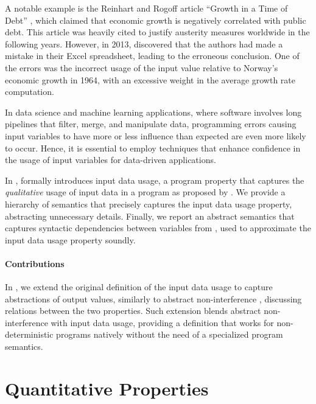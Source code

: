 A notable example is the Reinhart and Rogoff article “Growth in a Time of Debt” , which claimed that economic growth is negatively correlated with public debt.
This article was heavily cited to justify austerity measures worldwide in the following years.
However, in 2013,  discovered that the authors had made a mistake in their Excel spreadsheet, leading to the erroneous conclusion.
One of the errors was the incorrect usage of the input value relative to Norway's economic growth in 1964, with an excessive weight in the average growth rate computation.

In data science and machine learning applications, where software involves long pipelines that filter, merge, and manipulate data, programming errors causing input variables to have more or less influence than expected are even more likely to occur.
Hence, it is essential to employ techniques that enhance confidence in the usage of input variables for data-driven applications.


In ,  formally introduces input data usage, a program property that captures the \emph{qualitative} usage of input data in a program as proposed by \textcite{Urban2018}.
We provide a hierarchy of semantics that precisely captures the input data usage property, abstracting unnecessary details.
Finally, we report an abstract semantics that captures syntactic dependencies between variables from , used to approximate the input data usage property soundly.


\paragraph{Contributions}

In , we extend the original definition of the input data usage to capture abstractions of output values, similarly to abstract non-interference , discussing relations between the two properties.
Such extension blends abstract non-interference with input data usage, providing a definition that works for non-deterministic programs natively without the need of a specialized program semantics.


\section{Quantitative Properties}

